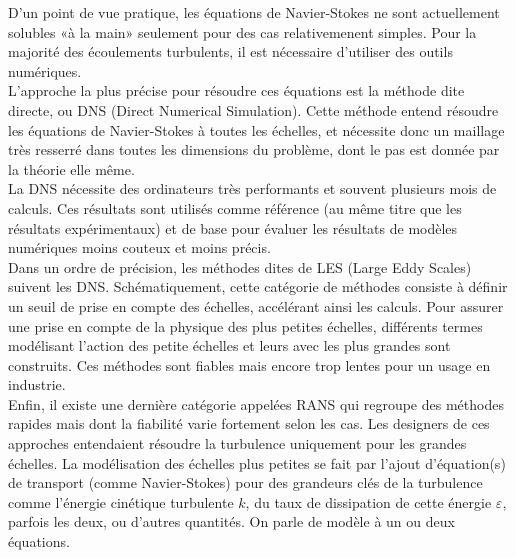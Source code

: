 \documentclass[a4paper,12pt]{article}
\newcommand{\keps}{$k-\varepsilon$}
\newcommand{\NS}{Navier-Stokes}
\numberwithin{equation}{section} %
\begin{document}
\noindent D'un point de vue pratique, les équations de \NS $ $ ne sont actuellement solubles «à la main» seulement pour des cas relativemenent simples. Pour la majorité des écoulements turbulents, il est nécessaire d'utiliser des outils numériques.\\
L'approche la plus précise pour résoudre ces équations est la méthode dite directe, ou DNS (Direct Numerical Simulation). Cette méthode entend résoudre les équations de \NS $ $ à toutes les échelles, et nécessite donc un maillage très resserré dans toutes les dimensions du problème, dont le pas est donnée par la théorie elle même. \\
La DNS nécessite des ordinateurs très performants et souvent plusieurs mois de calculs. Ces résultats sont utilisés comme référence (au même titre que les résultats expérimentaux) et de base pour évaluer les résultats de modèles numériques moins couteux et moins précis.\\
Dans un ordre de précision, les méthodes dites de LES (Large Eddy Scales) suivent les DNS. Schématiquement, cette catégorie de méthodes consiste à définir un seuil de prise en compte des échelles, accélérant ainsi les calculs. Pour assurer une prise en compte de la physique des plus petites échelles, différents termes modélisant l'action des petite échelles et leurs avec les plus grandes sont construits. Ces méthodes sont fiables mais encore trop lentes pour un usage en industrie.\\

\noindent Enfin, il existe une dernière catégorie appelées RANS qui regroupe des méthodes rapides mais dont la fiabilité varie fortement selon les cas. Les designers de ces approches entendaient résoudre la turbulence uniquement pour les grandes échelles. La modélisation des échelles plus petites se fait par l'ajout d'équation(s) de transport (comme Navier-Stokes) pour des grandeurs clés de la turbulence comme l'énergie cinétique turbulente $k$, du taux de dissipation de cette énergie $\varepsilon$, parfois les deux, ou d'autres quantités. On parle de modèle à un ou deux équations. \\%
\end{document}
